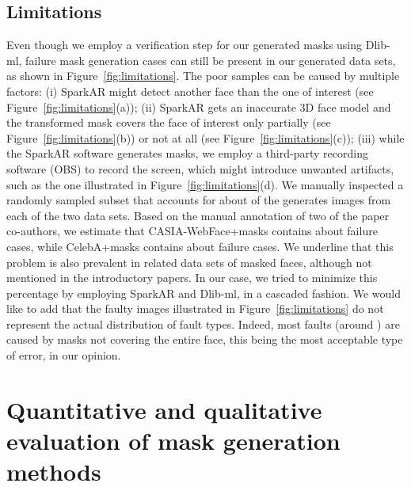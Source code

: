 \documentclass{article}
\begin{document}
\subsection{Limitations}

Even though we employ a verification step for our generated masks using Dlib-ml, failure mask generation cases can still be present in our generated data sets, as shown in Figure~\ref{fig:limitations}. The poor samples can be caused by multiple factors: (i) SparkAR might detect another face than the one of interest (see Figure~\ref{fig:limitations}(a)); (ii) SparkAR gets an inaccurate 3D face model and the transformed mask covers the face of interest only partially (see Figure~\ref{fig:limitations}(b)) or not at all (see Figure~\ref{fig:limitations}(c)); (iii) while the SparkAR software generates masks, we employ a third-party recording software (OBS) to record the screen, which might introduce unwanted artifacts, such as the one illustrated in Figure~\ref{fig:limitations}(d). We manually inspected a randomly sampled subset that accounts for about  of the generates images from each of the two data sets. Based on the manual annotation of two of the paper co-authors, we estimate that {CASIA-WebFace+masks} contains about  failure cases, while {CelebA+masks} contains about  failure cases. We underline that this problem is also prevalent in related data sets of masked faces, although not mentioned in the introductory papers. In our case, we tried to minimize this percentage by employing SparkAR and Dlib-ml, in a cascaded fashion. We would like to add that the faulty images illustrated in Figure~\ref{fig:limitations} do not represent the actual distribution of fault types. Indeed, most faults (around ) are caused by masks not covering the entire face, this being the most acceptable type of error, in our opinion. 

\section{Quantitative and qualitative evaluation of mask generation methods}
\label{sec:comparison}
\end{document}

